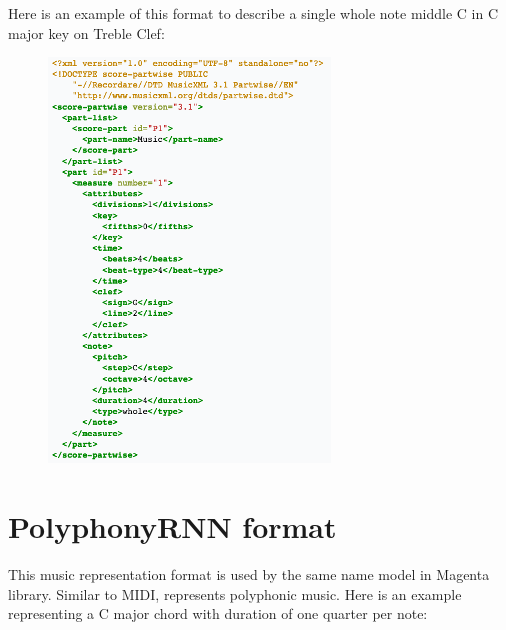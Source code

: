 Here is an example of this format to describe a single whole note middle C in C major key
on Treble Clef:

\begin{figure}[ht!]
    \centering
    \includegraphics[width=\linewidth]{image/fig_JDF29.png}
\end{figure}

\section{PolyphonyRNN format}

This music representation format is used by the same name model in Magenta library.
Similar to MIDI, represents polyphonic music. Here is an example representing a C major
chord with duration of one quarter per note:

